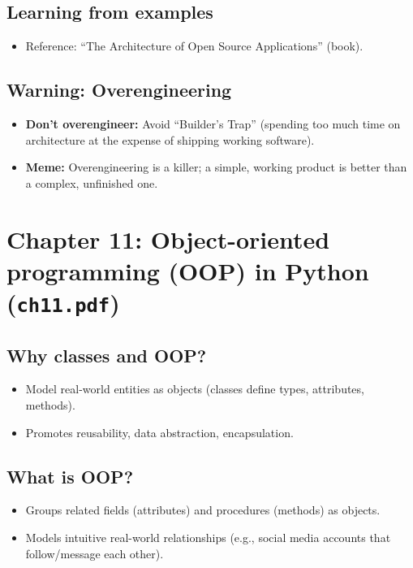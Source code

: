 \documentclass[11pt,a4paper]{article}
\begin{document}
\subsection*{Learning from examples}
\begin{itemize}
    \item Reference: ``The Architecture of Open Source Applications'' (book).
\end{itemize}

\subsection*{Warning: Overengineering}
\begin{itemize}
    \item \textbf{Don't overengineer:} Avoid ``Builder's Trap'' (spending too much time on architecture at the expense of shipping working software).
    \item \textbf{Meme:} Overengineering is a killer; a simple, working product is better than a complex, unfinished one.
\end{itemize}

\section{Chapter 11: Object-oriented programming (OOP) in Python (\texttt{ch11.pdf})}

\subsection*{Why classes and OOP?}
\begin{itemize}
    \item Model real-world entities as objects (classes define types, attributes, methods).
    \item Promotes reusability, data abstraction, encapsulation.
\end{itemize}

\subsection*{What is OOP?}
\begin{itemize}
    \item Groups related fields (attributes) and procedures (methods) as objects.
    \item Models intuitive real-world relationships (e.g., social media accounts that follow/message each other).
\end{itemize}
\end{document}
